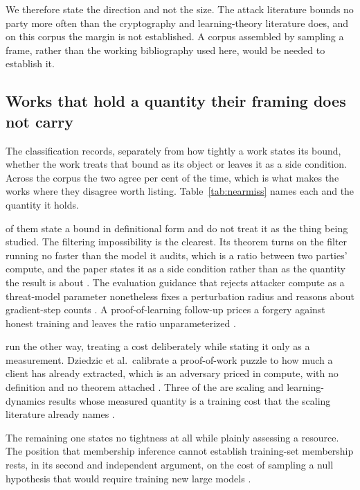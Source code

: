 We therefore state the direction and not the size. The attack literature bounds no
party more often than the cryptography and learning-theory literature does, and on
this corpus the margin is not established. A corpus assembled by sampling a frame,
rather than the working bibliography used here, would be needed to establish it.

\subsection{Works that hold a quantity their framing does not carry}

The classification records, separately from how tightly a work states its bound,
whether the work treats that bound as its object or leaves it as a side condition.
Across the corpus the two agree \AssessedPredictable{} per cent of the time, which
is what makes the \NearMiss{} works where they disagree worth listing.
Table~\ref{tab:nearmiss} names each and the quantity it holds.



\NearMissA{} of them state a bound in definitional form and do not treat it as the
thing being studied. The filtering impossibility is the clearest. Its theorem turns
on the filter running no faster than the model it audits, which is a ratio between
two parties' compute, and the paper states it as a side condition rather than as the
quantity the result is about \cite{BGGKRR26}. The evaluation guidance that rejects
attacker compute as a threat-model parameter nonetheless fixes a perturbation radius
and reasons about gradient-step counts \cite{CAPBRTGMK19}. A proof-of-learning
follow-up prices a forgery against honest training and leaves the ratio
unparameterized \cite{ZFWCSXZ26}.

\NearMissB{} run the other way, treating a cost deliberately while stating it only
as a measurement. Dziedzic et al.\ calibrate a proof-of-work puzzle to how much a
client has already extracted, which is an adversary priced in compute, with no
definition and no theorem attached \cite{DKLP22}. Three of the \NearMissB{} are
scaling and learning-dynamics results whose measured quantity is a training cost
that the scaling literature already names \cite{SGSGM22,BAP25,BEGKMZ22}.

The remaining one states no tightness at all while plainly assessing a resource.
The position that membership inference cannot establish training-set membership
rests, in its second and independent argument, on the cost of sampling a null
hypothesis that would require training new large models \cite{ZDKT25}.

